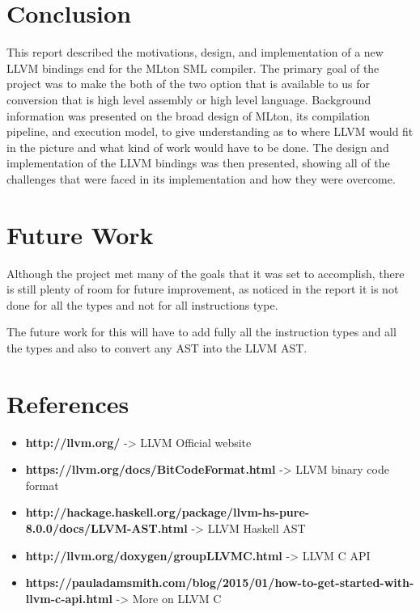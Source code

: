 \documentclass[openany]{book}
\begin{document}
\chapter{Conclusion}
This report described the motivations, design, and implementation of a new LLVM bindings end for the MLton SML compiler. The primary goal of the project was to make the both of the two option that is available to us for conversion that is high level assembly or high level language. \newline \newline Background information was presented on the broad design of MLton, its compilation pipeline, and execution model, to give understanding as to where LLVM would fit in the picture and what kind of work would have to be done. The design and implementation of the LLVM bindings was then presented, showing all of the challenges that were faced in its implementation and how they were overcome. 

\chapter{Future Work}
Although the project met many of the goals that it was set to accomplish, there is still plenty of  room  for  future  improvement,  as   noticed in the report it is not done for all the types and not for all instructions type. \newline

The future work for this will have to add fully all the instruction types and all the types and also to convert any AST into the LLVM AST.

\chapter{References}

\begin{itemize}
	\item \textbf{http://llvm.org/}  -> LLVM Official website
	\item \textbf{https://llvm.org/docs/BitCodeFormat.html} -> LLVM binary code format 
	\item \textbf{http://hackage.haskell.org/package/llvm-hs-pure-8.0.0/docs/LLVM-AST.html} -> LLVM Haskell AST 
	\item  \textbf{http://llvm.org/doxygen/groupLLVMC.html} -> LLVM C API
	\item \textbf{https://pauladamsmith.com/blog/2015/01/how-to-get-started-with-llvm-c-api.html} -> More on LLVM C
\end{itemize}
 
\end{document}
